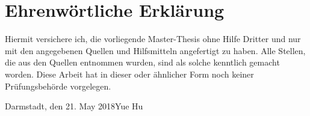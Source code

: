 \documentclass[twoside,bigchapter,colorback,accentcolor=tud4b,11pt]{tudreport}
\title{\RTRTitle}
\subtitle{\RTRThesisType}
\newcommand{\RTRThesisType}{Master-Thesis\xspace} %
\newcommand{\RTRName}{Yue Hu\xspace}
\newcommand{\RTRSubmissionDate}{21. May 2018\xspace}%
\begin{document}
	
 
	\frenchspacing
	\raggedbottom
	\maketitle	
  \chapter*{Ehrenw\"ortliche Erkl\"arung}
	Hiermit versichere ich, die vorliegende \RTRThesisType ohne Hilfe Dritter und nur mit den angegebenen Quellen 
    und Hilfsmitteln angefertigt zu haben. Alle Stellen, die aus den Quellen entnommen wurden, sind als solche 
    kenntlich gemacht worden. Diese Arbeit hat in dieser oder \"ahnlicher Form noch keiner Pr\"ufungsbeh\"orde vorgelegen.
    \vspace{1.5cm}
	
	\noindent Darmstadt, den \RTRSubmissionDate\hfill \RTRName
	
     

%
	
	\tableofcontents
	\listoffigures
	\listoftables
	\lstlistoflistings
	\cleardoublepage

%












%
% 
 	 
\end{document}
